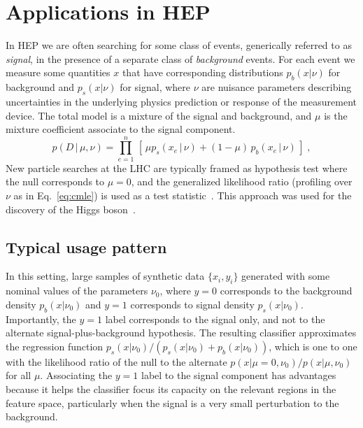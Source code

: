 \documentclass{article} %
\begin{document}
\section{Applications in HEP}

In HEP we are often searching for some 
class of events, generically referred to as \textit{signal}, in the presence of a separate class 
of \textit{background} events.  For each event we measure some quantities $x$ that have corresponding distributions 
$p_b(x|\nu)$ for background and $p_s(x|\nu)$ for signal, where $\nu$ are nuisance parameters describing 
uncertainties in the underlying physics prediction or response of the measurement device. The 
total model is a mixture of the signal and background, and $\mu$ is the mixture coefficient associate 
to the signal component. 
\begin{equation}\label{eq:hepGen}
p( D \,|\, \mu, \nu) = \prod_{e=1}^n \, \left[\, \mu p_s( x_e \, |\,  \nu)  + (1-\mu)\, p_b( x_e \,|\, \nu) \,\right] \; ,
\end{equation}
New particle searches at the LHC are typically framed as hypothesis test where the null corresponds to $\mu=0$, and the
generalized likelihood ratio (profiling over $\nu$ as in Eq.~\ref{eq:cmle}) is used as a test statistic~\cite{Cowan:2010js}. This approach was used for the discovery of the Higgs boson~\cite{Aad:2012tfa,Chatrchyan:2012ufa}.


\subsection{Typical usage pattern}

In this setting, large samples of synthetic data $\{x_i, y_i\}$ generated with some nominal values of the parameters $\nu_0$, where $y=0$ corresponds to the background density $p_b(x|\nu_0)$  and $y=1$ corresponds to signal density $p_s(x|\nu_0)$. Importantly, the $y=1$ label corresponds to the signal only, and not to the alternate signal-plus-background hypothesis. The resulting classifier approximates the regression function $p_s(x|\nu_0)/(p_s(x|\nu_0)+p_b(x|\nu_0))$, which is one to one with the likelihood ratio of the null to the alternate $p(x|\mu=0,\nu_0)/p(x|\mu,\nu_0)$ for all $\mu$. Associating the $y=1$ label to the signal component has advantages because it helps the classifier focus its capacity on the relevant regions in the feature space, particularly when the signal is a very small perturbation to the background. 
\end{document}

